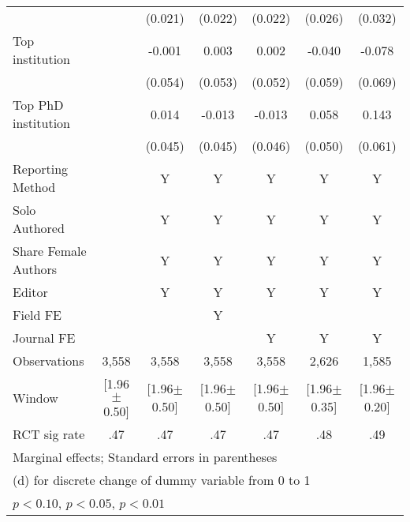 {\begin{tabular}{l*{6}{c}}
                &                  &  (0.021)         &  (0.022)         &  (0.022)         &  (0.026)         &  (0.032)         \\
Top institution &                  &   -0.001         &    0.003         &    0.002         &   -0.040         &   -0.078         \\
                &                  &  (0.054)         &  (0.053)         &  (0.052)         &  (0.059)         &  (0.069)         \\
Top PhD institution&                  &    0.014         &   -0.013         &   -0.013         &    0.058         &    0.143\sym{**} \\
                &                  &  (0.045)         &  (0.045)         &  (0.046)         &  (0.050)         &  (0.061)         \\
Reporting Method &                  &        Y         &        Y         &        Y         &        Y         &        Y         \\
Solo Authored   &                  &        Y         &        Y         &        Y         &        Y         &        Y         \\
Share Female Authors &                  &        Y         &        Y         &        Y         &        Y         &        Y         \\
Editor          &                  &        Y         &        Y         &        Y         &        Y         &        Y         \\
Field FE        &                  &                  &        Y         &                  &                  &                  \\
Journal FE      &                  &                  &                  &        Y         &        Y         &        Y         \\
\hline
Observations    &    3,558         &    3,558         &    3,558         &    3,558         &    2,626         &    1,585         \\
Window          &[1.96$\pm$0.50]         &[1.96$\pm$0.50]         &[1.96$\pm$0.50]         &[1.96$\pm$0.50]         &[1.96$\pm$0.35]         &[1.96$\pm$0.20]         \\
RCT sig rate    &      .47         &      .47         &      .47         &      .47         &      .48         &      .49         \\
\hline\hline
\multicolumn{7}{l}{\footnotesize Marginal effects; Standard errors in parentheses}\\
\multicolumn{7}{l}{\footnotesize  (d) for discrete change of dummy variable from 0 to 1}\\
\multicolumn{7}{l}{\footnotesize \sym{*} \(p<0.10\), \sym{**} \(p<0.05\), \sym{***} \(p<0.01\)}\\
\end{tabular}
}
